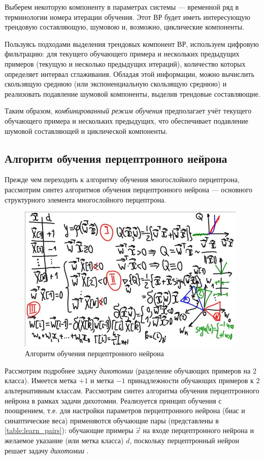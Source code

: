 \documentclass{article}
\numberwithin{equation}{subsection}
\begin{document}
Выберем некоторую компоненту в параметрах системы --- временной ряд в терминологии
номера итерации обучения. Этот ВР будет иметь интересующую трендовую составляющую,
шумовою и, возможно, циклические компоненты.

Пользуясь подходами выделения трендовых компонент ВР, используем цифровую фильтрацию:
для текущего обучающего примера и нескольких предыдущих примеров (текущую и несколько
предыдущих итераций), количество которых определяет интервал сглаживания.
Обладая этой информации, можно вычислить скользящую среднюю (или экспоненциальную 
скользящую среднюю) и реализовать подавление шумовой компоненты, выделив 
трендовые составляющие.

Таким образом, \textit{комбинированный режим обучения} предполагает учёт текущего
обучающего примера и нескольких предыдущих, что обеспечивает подавление шумовой 
составляющей и циклической компоненты.




\subsection{Алгоритм обучения перцептронного нейрона}

Прежде чем переходить к алгоритму обучения многослойного перцептрона, рассмотрим
синтез алгоритмов обучения перцептронного нейрона --- основного структурного
элемента многослойного перцептрона.

\begin{figure}[htbp]
    \centering
    \includegraphics[height=7cm]{hyperflat_6_1.jpeg}
    \caption{Алгоритм обучения перцептронного нейрона}
    \label{hyperflat_6_1}
\end{figure}

Рассмотрим подробнее задачу \textit{дихотомии} (разделение обучающих примеров 
на 2 класса). Имеется метка $+1$ и метка $-1$ принадлежности обучающих примеров 
к 2 альтернативным классам. Рассмотрим синтез алгоритма обучения перцептронного 
нейрона в рамках задачи дихотомии. Реализуется принцип обучения с поощрением, т.е.
для настройки параметров перцептронного нейрона (биас и синаптические веса) 
применяются обучающие пары (представлены в \ref{table:learn_pairs}): обучающие примеры
$\vec{x}$ на входе перцептронного нейрона и желаемое указание (или метка класса) $d$,
поскольку перцептронный нейрон решает задачу \textit{дихотомии} .
\end{document}
